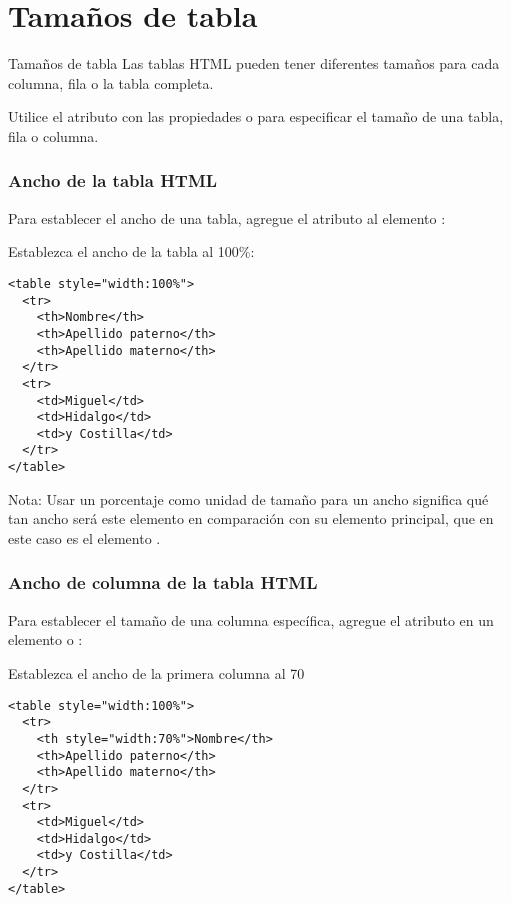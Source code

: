 \section{Tamaños de tabla}

\begin{frame}[c]{Tamaños de tabla}
  Las tablas HTML pueden tener diferentes tamaños para cada columna,
  fila o la tabla completa.

  \vspace{\baselineskip}
  Utilice el atributo  con las propiedades  o
   para especificar el tamaño de una tabla, fila o columna.
\end{frame}

\begin{frame}[fragile]
  \frametitle{Ancho de la tabla HTML}

  Para establecer el ancho de una tabla, agregue el atributo 
  al elemento :

  Establezca el ancho de la tabla al 100\%:
  \begin{lstlisting}
<table style="width:100%">
  <tr>
    <th>Nombre</th>
    <th>Apellido paterno</th>
    <th>Apellido materno</th>
  </tr>
  <tr>
    <td>Miguel</td>
    <td>Hidalgo</td>
    <td>y Costilla</td>
  </tr>
</table> 
  \end{lstlisting}

  \begin{exampleblock}{Nota:}
    Usar un porcentaje como unidad de tamaño para un ancho significa
    qué tan ancho será este elemento en comparación con su elemento
    principal, que en este caso es el elemento .
  \end{exampleblock}
\end{frame}

\begin{frame}[fragile]
  \frametitle{Ancho de columna de la tabla HTML}

  Para establecer el tamaño de una columna específica,
  agregue el atributo  en un elemento 
  o :

  \vspace{\baselineskip}
  Establezca el ancho de la primera columna al 70%
  \begin{lstlisting}
<table style="width:100%">
  <tr>
    <th style="width:70%">Nombre</th>
    <th>Apellido paterno</th>
    <th>Apellido materno</th>
  </tr>
  <tr>
    <td>Miguel</td>
    <td>Hidalgo</td>
    <td>y Costilla</td>
  </tr>
</table> 
  \end{lstlisting}
\end{frame}

